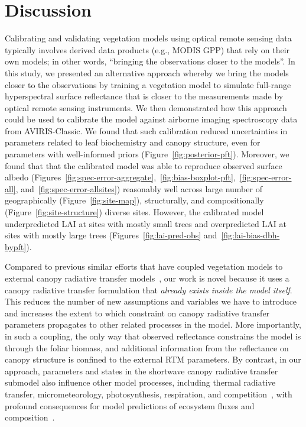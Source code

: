 \section{Discussion}

Calibrating and validating vegetation models using optical remote sensing data typically involves derived data products (e.g., MODIS GPP) that rely on their own models;
in other words, ``bringing the observations closer to the models''.
In this study, we presented an alternative approach whereby we bring the models closer to the observations by training a vegetation model to simulate full-range hyperspectral surface reflectance that is closer to the measurements made by optical remote sensing instruments.
We then demonstrated how this approach could be used to calibrate the model against airborne imaging spectroscopy data from AVIRIS-Classic.
We found that such calibration reduced uncertainties in parameters related to leaf biochemistry and canopy structure, even for parameters with well-informed priors (Figure~\ref{fig:posterior-pft}).
Moreover, we found that that the calibrated model was able to reproduce observed surface albedo
(Figures~\ref{fig:spec-error-aggregate},~\ref{fig:bias-boxplot-pft},~\ref{fig:spec-error-all}, and~\ref{fig:spec-error-allsites})
reasonably well across large number of geographically (Figure~\ref{fig:site-map}), structurally, and compositionally (Figure~\ref{fig:site-structure}) diverse sites.
However, the calibrated model underpredicted LAI at sites with mostly small trees and overpredicted LAI at sites with mostly large trees (Figures~\ref{fig:lai-pred-obs} and~\ref{fig:lai-bias-dbh-bypft}).

Compared to previous similar efforts that have coupled vegetation models to external canopy radiative transfer models~\citep{knorr2001assimilation, nouvellon2001coupling, quaife2008assimilating},
our work is novel because it uses a canopy radiative transfer formulation that \emph{already exists inside the model itself}.
This reduces the number of new assumptions and variables we have to introduce and increases the extent to which constraint on canopy radiative transfer parameters propagates to other related processes in the model.
More importantly, in such a coupling, the only way that observed reflectance constrains the model is through the foliar biomass, and additional information from the reflectance on canopy structure is confined to the external RTM parameters.
By contrast, in our approach, parameters and states in the shortwave canopy radiative transfer submodel also influence other model processes, including thermal radiative transfer, micrometeorology, photosynthesis, respiration, and competition~\citep{longo2019ed2description}, with profound consequences for model predictions of ecosystem fluxes and composition~\citep{viskari_2019_influence}.

